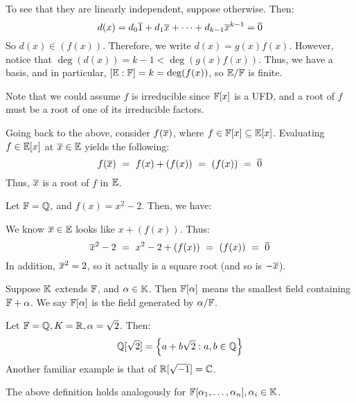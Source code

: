 To see that they are linearly independent, suppose otherwise. Then:
\begin{equation*}
    d(x) = d_{0}\overline{1}+d_{1}\overline{x}+\dots+d_{k-1}\overline{x}^{k-1} = \overline{0}
\end{equation*}
So $ d(x) \in (f(x)) $. Therefore, we write $ d(x) = g(x)f(x) $. However, notice
that $ \deg(d(x)) = k-1 < \deg(g(x)f(x)) $. Thus, we have a basis, and in
particular, $ [\mathbb{E}:\mathbb{F}] = k = \deg(f(x)) $, so $ \mathbb{E}/\mathbb{F} $ is finite.

Note that we could assume $ f $ is irreducible since $ \mathbb{F}[x] $ is a UFD, and
a root of $ f $ must be a root of one of its irreducible factors.

Going back to the above, consider $ f(\overline{x}) $, where $ f \in \mathbb{F}[x]
\subseteq \mathbb{E}[x] $. Evaluating $ f \in \mathbb{E}[x] $ at $ \overline{x} \in \mathbb{E} $
yields the following:
\begin{equation*}
    f(\overline{x}) \ = \ f(x) + (f(x)) \ = \ (f(x)) \ = \ \overline{0}
\end{equation*}
Thus, $ \overline{x} $ is a root of $ f $ in $ \mathbb{E} $.

\begin{xmp}[source=Primary Source Material]
    Let $ \mathbb{F} = \mathbb{Q} $, and $ f(x) = x^{2} - 2 $. Then, we have:

    \centering
    \flushleft
    
    We know $ \overline{x} \in \mathbb{E} $ looks like $ x + (f(x)) $. Thus:
    \begin{equation*}
        \overline{x}^{2} - 2 \ = \ x^{2} - 2 + (f(x)) \ = \ (f(x)) \ = \ \overline{0}
    \end{equation*}
    In addition, $ \overline{x}^{2} = 2 $, so it actually is a square root (and so
    is $ -\overline{x} $).
\end{xmp}

\begin{defn}
    Suppose $ \mathbb{K} $ extends $ \mathbb{F} $, and $ \alpha \in \mathbb{K} $.
    Then $ \mathbb{F}[\alpha] $ means the smallest field containing
    $ \mathbb{F} + \alpha $. \vsp
    We say $ \mathbb{F}[\alpha] $ is the field generated by $ \alpha/\mathbb{F} $.
\end{defn}

\begin{xmp}[source=Primary Source Material]
    Let $ \mathbb{F} = \mathbb{Q}, K = \mathbb{R}, \alpha = \sqrt{2} $. Then:
    \begin{equation*}
        \mathbb{Q}[\sqrt{2}] = \left\{{a+b\sqrt{2} : a,b \in \mathbb{Q}}\right\}
    \end{equation*}
    Another familiar example is that of $ \mathbb{R}[\sqrt{-1}] = \mathbb{C} $.
\end{xmp}
The above definition holds analogously for $ \mathbb{F}[\alpha_{1}, \dots,
\alpha_{n}], \alpha_{i} \in \mathbb{K} $.

